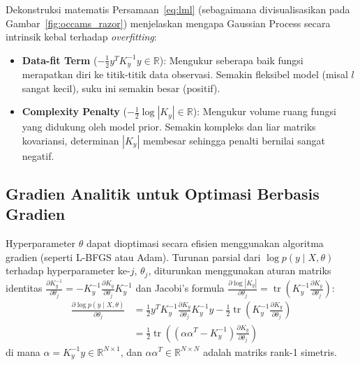 \documentclass[11pt,a4paper]{article}
\def\boldsymbol#1{#1}%
\def\mathbf#1{#1}%
\begin{document}
Dekonstruksi matematis Persamaan~\eqref{eq:lml} (sebagaimana divisualisasikan pada Gambar~\ref{fig:occams_razor}) menjelaskan mengapa Gaussian Process secara intrinsik kebal terhadap \textit{overfitting}:
\begin{itemize}
    \item \textbf{Data-fit Term} ($-\frac{1}{2} \mathbf{y}^T K_y^{-1} \mathbf{y} \in \mathbb{R}$): Mengukur seberapa baik fungsi merapatkan diri ke titik-titik data observasi. Semakin fleksibel model (misal $l$ sangat kecil), suku ini semakin besar (positif).
    \item \textbf{Complexity Penalty} ($-\frac{1}{2} \log |K_y| \in \mathbb{R}$): Mengukur volume ruang fungsi yang didukung oleh model prior. Semakin kompleks dan liar matriks kovariansi, determinan $|K_y|$ membesar sehingga penalti bernilai sangat negatif.
\end{itemize}

\subsection{Gradien Analitik untuk Optimasi Berbasis Gradien}
Hyperparameter $\boldsymbol{\theta}$ dapat dioptimasi secara efisien menggunakan algoritma gradien (seperti L-BFGS atau Adam). Turunan parsial dari $\log p(\mathbf{y} \mid X, \boldsymbol{\theta})$ terhadap hyperparameter ke-$j$, $\theta_j$, diturunkan menggunakan aturan matriks identitas $\frac{\partial K_y^{-1}}{\partial \theta_j} = -K_y^{-1} \frac{\partial K_y}{\partial \theta_j} K_y^{-1}$ dan Jacobi's formula $\frac{\partial \log |K_y|}{\partial \theta_j} = \operatorname{tr}\left(K_y^{-1} \frac{\partial K_y}{\partial \theta_j}\right)$:
\begin{align}
\frac{\partial \log p(\mathbf{y} \mid X, \boldsymbol{\theta})}{\partial \theta_j} &= \frac{1}{2} \mathbf{y}^T K_y^{-1} \frac{\partial K_y}{\partial \theta_j} K_y^{-1} \mathbf{y} - \frac{1}{2} \operatorname{tr}\left( K_y^{-1} \frac{\partial K_y}{\partial \theta_j} \right) \nonumber \\
&= \frac{1}{2} \operatorname{tr}\left( \left( \boldsymbol{\alpha} \boldsymbol{\alpha}^T - K_y^{-1} \right) \frac{\partial K_y}{\partial \theta_j} \right)
\end{align}
di mana $\boldsymbol{\alpha} = K_y^{-1}\mathbf{y} \in \mathbb{R}^{N \times 1}$, dan $\boldsymbol{\alpha}\boldsymbol{\alpha}^T \in \mathbb{R}^{N \times N}$ adalah matriks rank-1 simetris.

\end{document}
